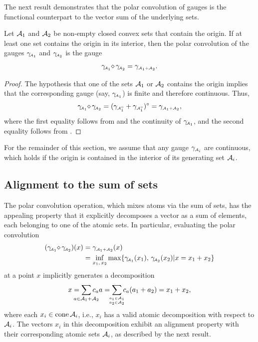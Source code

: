 The next result demonstrates that the polar convolution of gauges is the
functional counterpart to the vector sum of the underlying sets.
\begin{proposition} \label{prop:max-convolution} Let $\mathcal{A}_1$ and $\mathcal{A}_2$ be
  non-empty closed convex sets that contain the origin. If at least
  one set contains the origin in its interior, then the polar
  convolution of the gauges $\gamma_{\!\scriptscriptstyle\mathcal{A}_1}$ and $\gamma_{\!\scriptscriptstyle\mathcal{A}_2}$ is the gauge
  \[
    \gamma_{\!\scriptscriptstyle\mathcal{A}_1}\!\mathop{\diamond}\gamma_{\!\scriptscriptstyle\mathcal{A}_2} = \gamma_{\scriptscriptstyle\mathcal{A}_1+\mathcal{A}_2}.
  \]
\end{proposition}

\begin{proof}
  The hypothesis that one of the sets $\mathcal{A}_1$ or $\mathcal{A}_2$ contains the origin
  implies that the corresponding gauge (say, $\gamma_{\!\scriptscriptstyle\mathcal{A}_1}$) is finite and
  therefore continuous. Thus, 
  \begin{align*}
    \gamma_{\!\scriptscriptstyle\mathcal{A}_1}\!\mathop{\diamond}\gamma_{\!\scriptscriptstyle\mathcal{A}_2}
     = (\gamma_{\scriptscriptstyle\mathcal{A}_1^\circ}
      + \gamma_{\scriptscriptstyle\mathcal{A}_1^\circ})^\circ
     = \gamma_{\scriptscriptstyle\mathcal{A}_1+\mathcal{A}_2},
  \end{align*}
  where the first equality follows from
  \cite[Lemma~3.3]{friedlander2019polarconvolution} and the continuity of
  $\gamma_{\!\scriptscriptstyle\mathcal{A}_1}$, and the second equality follows from
  \cite[Lemma~3.4]{friedlander2019polarconvolution}.
\end{proof}

For the remainder of this section, we assume that any gauge
$\gamma_{\scriptscriptstyle\mathcal{A}_i}$ are continuous, which holds if the origin
is contained in the interior of its generating set $\mathcal{A}_i$.

\subsection{Alignment to the sum of sets}

The polar convolution operation, which mixes atoms via the sum of
sets, has the appealing property that it explicitly decomposes a
vector as a sum of elements, each belonging to one of the atomic
sets. In particular, evaluating the polar convolution
\begin{equation*}
  \begin{aligned}
  (\gamma_{\!\scriptscriptstyle\mathcal{A}_1}\!\mathop{\diamond}\gamma_{\!\scriptscriptstyle\mathcal{A}_2})(x)
  &= \gamma_{\scriptscriptstyle\mathcal{A}_1+\mathcal{A}_2}(x)
  \\&= \inf_{x_1,\,x_2}\max\{\gamma_{\!\scriptscriptstyle\mathcal{A}_1}(x_1),\,\gamma_{\!\scriptscriptstyle\mathcal{A}_2}(x_2)|x=x_1+x_2\}
  \end{aligned}
\end{equation*}
at a point $x$ implicitly generates a decomposition
\[
  x = \sum_{\mathclap{a\in\Ascr_1+\Ascr_2}}c_aa
  = \sum_{\mathclap{\genfrac{}{}{0pt}{}{a_1\in\Ascr_1}{a_2\in\Ascr_2}}}c_a(a_1+a_2)
    = x_1 + x_2,
\]
where each $x_i\in\operatorname{cone}\mathcal{A}_i$, i.e., $x_i$ has a valid atomic decomposition
with respect to $\mathcal{A}_i$.  The vectors $x_i$ in this decomposition exhibit an
alignment property with their corresponding atomic sets $\mathcal{A}_i$, as described
by the next result.


